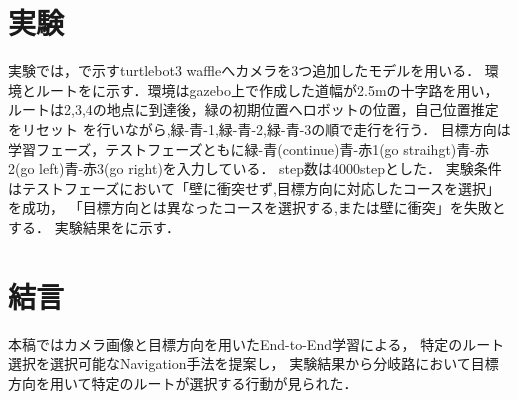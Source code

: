 \documentclass[10pt]{jarticle}
\begin{document}
    \section{実\hspace{2zw}験}%
    実験では，で示すturtlebot3 waffleへカメラを3つ追加したモデルを用いる．
    環境とルートをに示す．環境はgazebo上で作成した道幅が2.5mの十字路を用い，
    ルートは2,3,4の地点に到達後，緑の初期位置へロボットの位置，自己位置推定をリセット
    を行いながら,緑-青-1,緑-青-2,緑-青-3の順で走行を行う．
    目標方向は学習フェーズ，テストフェーズともに緑-青(continue)青-赤1(go straihgt)青-赤2(go left)青-赤3(go right)を入力している．
    step数は4000stepとした．
    実験条件はテストフェーズにおいて「壁に衝突せず,目標方向に対応したコースを選択」を成功，
     「目標方向とは異なったコースを選択する,または壁に衝突」を失敗とする．
    実験結果をに示す．
       
    
            
    \section{結\hspace{2zw}言}%
    本稿ではカメラ画像と目標方向を用いたEnd-to-End学習による，
    特定のルート選択を選択可能なNavigation手法を提案し，
    実験結果から分岐路において目標方向を用いて特定のルートが選択する行動が見られた．
    
\end{document}
